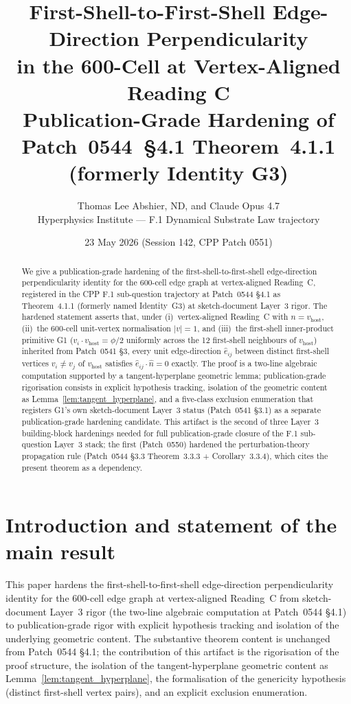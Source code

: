 \documentclass[11pt,letterpaper]{article}
\title{First-Shell-to-First-Shell Edge-Direction Perpendicularity \\
in the 600-Cell at Vertex-Aligned Reading C \\
\large Publication-Grade Hardening of Patch~0544~\S4.1 Theorem~4.1.1 (formerly Identity G3)}
\author{Thomas Lee Abshier, ND, and Claude Opus 4.7\\Hyperphysics Institute --- F.1 Dynamical Substrate Law trajectory}
\date{23 May 2026 (Session 142, CPP Patch 0551)}
\newcommand{\nhat}{\hat{n}}
\newcommand{\vhost}{v_{\text{host}}}
\begin{document}
\maketitle

\begin{abstract}
We give a publication-grade hardening of the first-shell-to-first-shell edge-direction perpendicularity identity for the 600-cell edge graph at vertex-aligned Reading~C, registered in the CPP F.1 sub-question trajectory at Patch~0544 \S4.1 as Theorem~4.1.1 (formerly named Identity~G3) at sketch-document Layer~3 rigor. The hardened statement asserts that, under (i)~vertex-aligned Reading~C with $\nhat = \vhost$, (ii)~the 600-cell unit-vertex normalisation $|v|=1$, and (iii)~the first-shell inner-product primitive G1 ($v_i\cdot\vhost = \phi/2$ uniformly across the 12 first-shell neighbours of $\vhost$) inherited from Patch~0541 \S3, every unit edge-direction $\hat{e}_{ij}$ between distinct first-shell vertices $v_i \neq v_j$ of $\vhost$ satisfies $\hat{e}_{ij}\cdot\nhat = 0$ exactly. The proof is a two-line algebraic computation supported by a tangent-hyperplane geometric lemma; publication-grade rigorisation consists in explicit hypothesis tracking, isolation of the geometric content as Lemma~\ref{lem:tangent_hyperplane}, and a five-class exclusion enumeration that registers G1's own sketch-document Layer~3 status (Patch~0541 \S3.1) as a separate publication-grade hardening candidate. This artifact is the second of three Layer~3 building-block hardenings needed for full publication-grade closure of the F.1 sub-question Layer~3 stack; the first (Patch~0550) hardened the perturbation-theory propagation rule (Patch~0544 \S3.3 Theorem~3.3.3 + Corollary~3.3.4), which cites the present theorem as a dependency.
\end{abstract}

\section{Introduction and statement of the main result}\label{sec:introduction}

This paper hardens the first-shell-to-first-shell edge-direction perpendicularity identity for the 600-cell edge graph at vertex-aligned Reading~C from sketch-document Layer~3 rigor (the two-line algebraic computation at Patch~0544 \S4.1) to publication-grade rigor with explicit hypothesis tracking and isolation of the underlying geometric content. The substantive theorem content is unchanged from Patch~0544 \S4.1; the contribution of this artifact is the rigorisation of the proof structure, the isolation of the tangent-hyperplane geometric content as Lemma~\ref{lem:tangent_hyperplane}, the formalisation of the genericity hypothesis (distinct first-shell vertex pairs), and an explicit exclusion enumeration.
\end{document}
